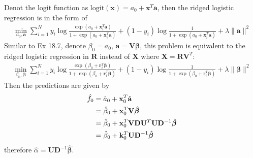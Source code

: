 \begin{exercise}
  Denot the logit function as $\mbox{logit}(\mathbf{x}) = a_0 +
  \mathbf{x}^T\mathbf{a}$, then the ridged logistic regression is in the form of
  \begin{align}
    \min_{a_0, \mathbf{a}} \sum_{i=1}^N y_i\log\frac{\exp(a_0 +
    \mathbf{x}_i^T\mathbf{a})}{1 + \exp(a_0 + \mathbf{x}_i^T\mathbf{a})}
    + (1 - y_i)\log\frac{1}{1 + \exp(a_0 + \mathbf{x}_i^T\mathbf{a})} 
    + \lambda\|\mathbf{a}\|^2
  \end{align}
  Similar to Ex 18.7, denote $\beta_0 = a_0$, $\mathbf{a} =
  \mathbf{V}\bm{\beta}$, this problem is equivalent to the ridged logistic
  regression in $\mathbf{R}$ instead of $\mathbf{X}$ where $\mathbf{X} =
  \mathbf{RV}^T$:
  \begin{align}
    \min_{\beta_0, \bm{\beta}} \sum_{i=1}^N y_i\log\frac{\exp(\beta_0 +
    \mathbf{r}_i^T\bm{\beta})}{1 + \exp(\beta_0 + \mathbf{r}_i^T\bm{\beta})}
    + (1 - y_i)\log\frac{1}{1 + \exp(\beta_0 + \mathbf{r}_i^T\bm{\beta})} 
    + \lambda\|\bm{\beta}\|^2
  \end{align}
  Then the predictions are given by
  \begin{align}
    \hat{f}_0 & = \hat{a}_0 + \mathbf{x}_0^T\hat{\mathbf{a}} \notag \\
    &= \hat{\beta}_0 + \mathbf{x}_0^T\mathbf{V}\hat{\bm{\beta}} \notag \\
    &= \hat{\beta}_0 + \mathbf{x}_0^T\mathbf{VDU}^T\mathbf{UD}^{-1}
    \hat{\bm{\beta}} \notag \\
    &= \hat{\beta}_0 + \mathbf{k}_0^T \mathbf{UD}^{-1}\hat{\bm{\beta}}
  \end{align}
  therefore $\hat{\alpha} = \mathbf{UD}^{-1}\hat{\bm{\beta}}$.
  

\end{exercise}
